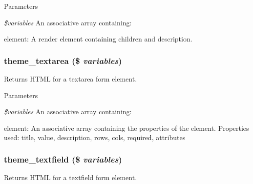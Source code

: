 \begin{DoxyParams}{Parameters}
\item[{\em \$variables}]An associative array containing:
\begin{DoxyItemize}
\item element: A render element containing children and description. 
\end{DoxyItemize}\end{DoxyParams}
\hypertarget{group__themeable_ga39add5682e6e4a90866a9337d81cfa94}{
\subsubsection[{theme\_\-textarea}]{\setlength{\rightskip}{0pt plus 5cm}theme\_\-textarea (\$ {\em variables})}}
\label{group__themeable_ga39add5682e6e4a90866a9337d81cfa94}
Returns HTML for a textarea form element.


\begin{DoxyParams}{Parameters}
\item[{\em \$variables}]An associative array containing:
\begin{DoxyItemize}
\item element: An associative array containing the properties of the element. Properties used: title, value, description, rows, cols, required, attributes 
\end{DoxyItemize}\end{DoxyParams}
\hypertarget{group__themeable_ga1c1ad681858baaf35a5ad1d0e8d4b65b}{
\subsubsection[{theme\_\-textfield}]{\setlength{\rightskip}{0pt plus 5cm}theme\_\-textfield (\$ {\em variables})}}
\label{group__themeable_ga1c1ad681858baaf35a5ad1d0e8d4b65b}
Returns HTML for a textfield form element.


